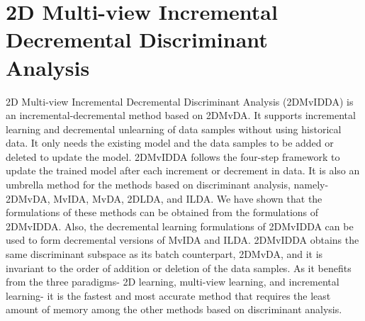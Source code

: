 \section[2D Multi-view Incremental Decremental Discriminant Analysis]{2D Multi-view Incremental Decremental Discriminant\\ Analysis}
\label{sec:Conc_2DMvIDDA}
2D Multi-view Incremental Decremental Discriminant Analysis (2DMvIDDA) is an incremental-decremental method based on 2DMvDA. It supports incremental learning and decremental unlearning of data samples without using historical data. It only needs the existing model and the data samples to be added or deleted to update the model. 2DMvIDDA follows the four-step framework to update the trained model after each increment or decrement in data. It is also an umbrella method for the methods based on discriminant analysis, namely- 2DMvDA, MvIDA, MvDA, 2DLDA, and ILDA. We have shown that the formulations of these methods can be obtained from the formulations of 2DMvIDDA. Also, the decremental learning formulations of 2DMvIDDA can be used to form decremental versions of MvIDA and ILDA. 2DMvIDDA obtains the same discriminant subspace as its batch counterpart, 2DMvDA, and it is invariant to the order of addition or deletion of the data samples. As it benefits from the three paradigms- 2D learning, multi-view learning, and incremental learning- it is the fastest and most accurate method that requires the least amount of memory among the other methods based on discriminant analysis.

%


